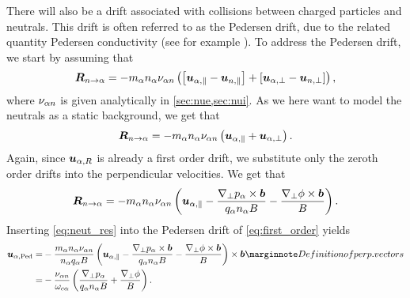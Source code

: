 There will also be a drift associated with collisions between charged particles and neutrals.
This drift is often referred to as the Pedersen drift, due to the related quantity Pedersen conductivity (see for example \cite{Baumjohann1997book}).
To address the Pedersen drift, we start by assuming that
%
\begin{align*}
    \boldsymbol{R}_{n\to\alpha} =
    -
     m_\alpha n_\alpha \nu_{\alpha n}\left(
        \left[\boldsymbol{u}_{\alpha,\|}-\boldsymbol{u}_{n,\|} \right]
        +
        \left[\boldsymbol{u}_{\alpha,\perp}-\boldsymbol{u}_{n,\perp} \right]
        \right),
\end{align*}
%
where $\nu_{\alpha n}$ is given analytically in \cref{sec:nue,sec:nui}.
As we here want to model the neutrals as a static background, we get that
%
\begin{align*}
    \boldsymbol{R}_{n\to\alpha} =
    -
     m_\alpha n_\alpha \nu_{\alpha n}\left(
        \boldsymbol{u}_{\alpha,\|}
        +
        \boldsymbol{u}_{\alpha,\perp}
        \right).
\end{align*}
%
Again, since $\boldsymbol{u}_{\alpha,R}$ is already a first order drift, we substitute only the zeroth order drifts into the perpendicular velocities.
We get that
%
\begin{align}
    \boldsymbol{R}_{n\to\alpha} =
    - m_\alpha n_\alpha \nu_{\alpha n}\left( \boldsymbol{u}_{\alpha,\|}
    - \frac{\nabla_\perp p_\alpha \times \boldsymbol{b}}{q_\alpha n_\alpha B}
    - \frac{\nabla_\perp \phi \times \boldsymbol{b}}{B} \right).
    \label{eq:neut_res}
\end{align}
%
Inserting \cref{eq:neut_res} into the Pedersen drift of \cref{eq:first_order} yields
%
\begin{align*}
    \ve{u}_{\a,\text{Ped}}
    =&
    - \frac{ m_\a n_\a \nu_{\a n} }{n_\a q_\a B} \L( \ve{u}_{\a,\|}
    - \frac{\grad_\perp p_\a \times \ve{b}}{q_\a n_\a B}
    - \frac{\grad_\perp \phi \times \ve{b}}{B} \R) \times\ve{b}
    \note{Definition of perp. vectors}
    \\
    =&
    - \frac{\nu_{\a n} }{\om_{c\a}}
    \L(\frac{\grad_\perp p_\a}{q_\a n_\a B}
    + \frac{\grad_\perp \phi}{B} \R).
\end{align*}



